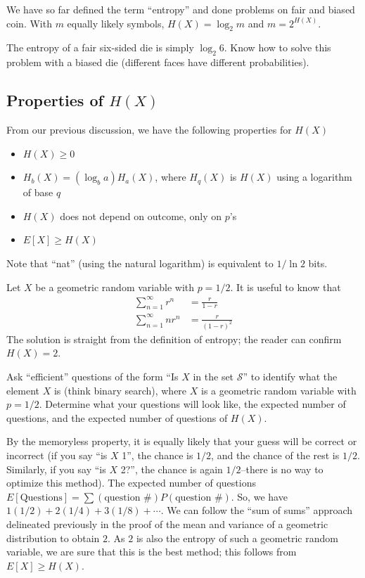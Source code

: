 \documentclass[11pt]{article}
\theoremstyle{definition}
\begin{document}
We have so far defined the term ``entropy'' and done problems on fair and biased coin. With $m$ equally likely symbols, $H(X) = \log_2 m$ and $m = 2^{H(X)}$. 

\example The entropy of a fair six-sided die is simply $\log_2 6$. Know how to solve this problem with a biased die (different faces have different probabilities). 

\subsection{Properties of $H(X)$}

From our previous discussion, we have the following properties for $H(X)$
\begin{itemize}
\item $H(X) \geq 0$
\item $H_b(X) = (\log_b a) H_a(X)$, where $H_q(X)$ is $H(X)$ using a logarithm of base $q$ 
\item $H(X)$ does not depend on outcome, only on $p$'s
\item $E[X] \geq H(X)$
\end{itemize}

\noindent Note that ``nat'' (using the natural logarithm) is equivalent to $1/\ln 2$ bits. 

\example Let $X$ be a geometric random variable with $p = 1/2$. It is useful to know that
\begin{align*}
\sum_{n=1}^\infty r^n &= \frac{r}{1-r} \\
\sum_{n=1}^\infty nr^n &= \frac{r}{(1-r)^2}
\end{align*}
The solution is straight from the definition of entropy; the reader can confirm $H(X) = 2$.

\example Ask ``efficient'' questions of the form ``Is $X$ in the set $\mathcal{S}$'' to identify what the element $X$ is (think binary search), where $X$ is a geometric random variable with $p = 1/2$. Determine what your questions will look like, the expected number of questions, and the expected number of questions of $H(X)$.

By the memoryless property, it is equally likely that your guess will be correct or incorrect (if you say ``is $X$ 1'', the chance is $1/2$, and the chance of the rest is $1/2$. Similarly, if you say ``is $X$ 2?'', the chance is again $1/2$--there is no way to optimize this method). The expected number of questions $E[\text{Questions}] = \sum(\text{question \#})P(\text{question \#})$. So, we have $1(1/2) + 2(1/4) + 3(1/8) + \cdots$. We can follow the ``sum of sums'' approach delineated previously in the proof of the mean and variance of a geometric distribution to obtain $2$. As $2$ is also the entropy of such a geometric random variable, we are sure that this is the best method; this follows from $E[X] \geq H(X)$. 
\end{document}
